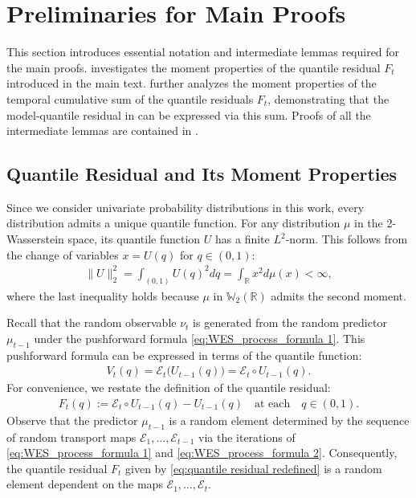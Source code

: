 \documentclass[a4paper, 11pt]{article}
\newcommand{\R}{\mathbb{R}}
\newcommand{\T}{\mathcal E}
\theoremstyle{definition}
\begin{document}
\section{Preliminaries for Main Proofs} \label{apx:preparation}

This section introduces essential notation and intermediate lemmas required for the main proofs.
 investigates the moment properties of the quantile residual $F_{t}$ introduced in the main text.
 further analyzes the moment properties of the temporal cumulative sum of the quantile residuals $F_{t}$, demonstrating that the model-quantile residual in  can be expressed via this sum.
Proofs of all the intermediate lemmas are contained in .



\subsection{Quantile Residual and Its Moment Properties} \label{apx:residual}

Since we consider univariate probability distributions in this work, every distribution admits a unique quantile function.
For any distribution $\mu$ in the 2-Wasserstein space, its quantile function $U$ has a finite $L^2$-norm. This follows from the change of variables $x = U(q)$ for $q \in (0, 1)$:
\begin{align}
	\| U \|_2^2 = \int_{(0,1)} U(q)^2 d q = \int_{\mathbb{R}} x^2 d \mu(x) < \infty ,
\end{align}
where the last inequality holds because $\mu$ in $\mathbb{W}_2(\R)$ admits the second moment.

Recall that the random observable $\nu_{t}$ is generated from the random predictor $\mu_{t-1}$ under the pushforward formula \eqref{eq:WES_process_formula 1}.
This pushforward formula can be expressed in terms of the quantile function:
\begin{align}
	V_{t}(q) = \mathcal{E}_{t}\big( U_{t-1}(q) \big) = \mathcal{E}_{t} \circ U_{t-1}(q) .
\end{align}
For convenience, we restate the definition of the quantile residual:
\begin{align}
	F_{t}(q) :=  \mathcal{E}_{t} \circ U_{t-1}(q) - U_{t-1}(q) \quad \text{at each} \quad q \in (0, 1).\label{eq:quantile residual redefined}
\end{align}
Observe that the predictor $\mu_{t-1}$ is a random element determined by the sequence of random transport maps $\T_1, \dots, \T_{t-1}$ via the iterations of \eqref{eq:WES_process_formula 1} and \eqref{eq:WES_process_formula 2}.
Consequently, the quantile residual $F_{t}$ given by \eqref{eq:quantile residual redefined} is a random element dependent on the maps $\T_1, \dots, \T_{t}$.
\end{document}
